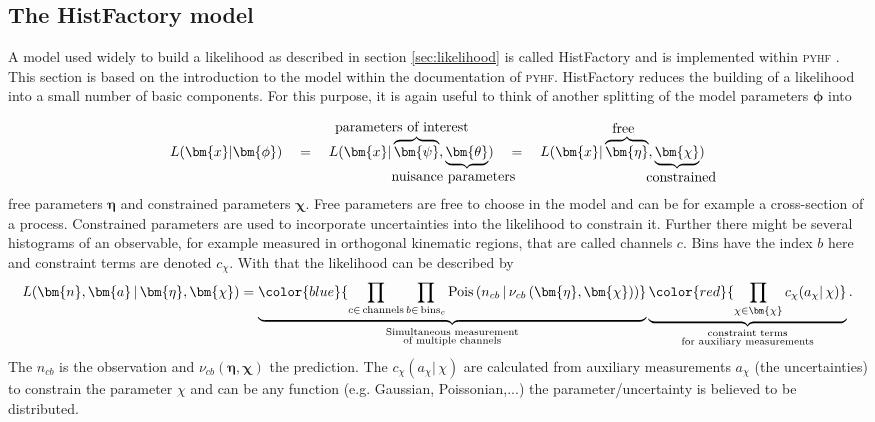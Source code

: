 \subsection{The HistFactory model}

A model used widely to build a likelihood as described in section \ref{sec:likelihood} is called HistFactory \citep{cranmer2012histfactory} and is implemented within \textsc{pyhf} \citep{pyhf}. This section is based on the introduction to the model within the documentation of \textsc{pyhf}. HistFactory reduces the building of a likelihood into a small number of basic components. For this purpose, it is again useful to think of another splitting of the model parameters $\bm{\phi}$ into

\newcommand{\freeset}{\bm{\eta}}
\newcommand{\constrset}{\bm{\chi}}
\newcommand{\singleconstr}{\chi}
\newcommand{\channelcounts}{\bm{n}}
\newcommand{\auxdata}{\bm{a}}
\newcommand{\poiset}{\bm{\psi}}
\newcommand{\nuisset}{\bm{\theta}}
\newcommand{\fullset}{\bm{\phi}}
\newcommand{\singlefull}{\phi}


\begin{equation}
 L(\bm{x}|\fullset) \quad=\quad
 L(\bm{x}|\overbrace{\poiset}^{\llap{\text{parameters of interest}}},\underbrace{\nuisset}_{\llap{\text{nuisance parameters}}}) \quad=\quad
 L(\bm{x}|\overbrace{\freeset}^{\rlap{\text{free}}},\underbrace{\constrset}_{\rlap{\text{constrained}}}) 
\end{equation}
free parameters $\freeset$ and constrained parameters $\constrset$. Free parameters are free to choose in the model and can be for example a cross-section of a process. Constrained parameters are used to incorporate uncertainties into the likelihood to constrain it. Further there might be several histograms of an observable, for example measured in orthogonal kinematic regions, that are called channels $c$. Bins have the index $b$ here and constraint terms are denoted $c_{\singleconstr}$. With that the likelihood can be described by 
\begin{equation}
L(\channelcounts, \auxdata \,|\,\freeset,\constrset) = \underbrace{\color{blue}{\prod_{c\in\mathrm{\,channels}} \prod_{b \in \mathrm{\,bins}_c}\textrm{Pois}\left(n_{cb} \,\middle|\, \nu_{cb}\left(\freeset,\constrset\right)\right)}}_{\substack{\text{Simultaneous measurement}\\%
\text{of multiple channels}}} \underbrace{\color{red}{\prod_{\singleconstr \in \constrset} c_{\singleconstr}(a_{\singleconstr} |\, \singleconstr)}}_{\substack{\text{constraint terms}\\%
\text{for }\text{auxiliary measurements}}}.
\end{equation}
The $n_{cb}$ is the observation and $\nu_{cb}(\freeset,\constrset)$ the prediction. The $c_{\singleconstr}(a_{\singleconstr} |\, \singleconstr)$ are calculated from auxiliary measurements $a_{\singleconstr}$ (the uncertainties) to constrain the parameter $\singleconstr$ and can be any function (e.g. Gaussian, Poissonian,...) the parameter/uncertainty is believed to be distributed.

